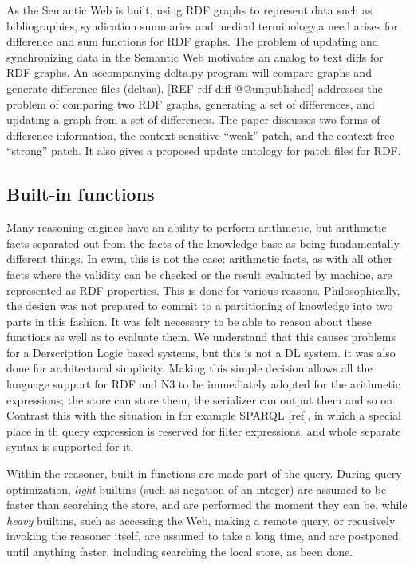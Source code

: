 \documentclass{tlp}
\begin{document}
\par As the Semantic Web is built, using RDF graphs\cite{RDFC04} to represent data such as
bibliographies\cite{DC02}, syndication
summaries\cite{RSS} and medical terminology\cite{Gol03},a need arises for difference and sum functions
for RDF graphs. The problem of updating and synchronizing data in
the Semantic Web motivates an analog to text diffs for RDF graphs.
An accompanying delta.py program will compare graphs and generate
difference files (deltas). [REF rdf diff @@unpublished] addresses
the problem of comparing two RDF graphs, generating a set of
differences, and updating a graph from a set of differences. The
paper discusses two forms of difference information, the
context-sensitive ``weak'' patch, and the context-free
``strong'' patch. It also gives a proposed update ontology for patch files for
RDF.
\subsection{\empty Built-in functions}
  

\par Many reasoning engines have an ability to perform arithmetic,
but arithmetic facts separated out from the facts of the knowledge
base as being fundamentally different things. In cwm, this is not
the case: arithmetic facts, as with all other facts where the
validity can be checked or the result evaluated by machine, are
represented as RDF properties. This is done for various reasons.
Philosophically, the design was not prepared to commit to a
partitioning of knowledge into two parts in this fashion. It was
felt necessary to be able to reason about these functions as well
as to evaluate them. We understand that this causes problems for a
Derscription Logic based systems, but this is not a DL system. it
was also done for architectural simplicity. Making this simple
decision allows all the language support for RDF and N3 to be
immediately adopted for the arithmetic expressions; the store can
store them, the serializer can output them and so on. Contrast this
with the situation in for example SPARQL [ref], in which a special
place in th query expression is reserved for filter expressions,
and whole separate syntax is supported for it.

\par Within the reasoner, built-in functions are made part of the
query. During query optimization, {\em light} builtins (such as
negation of an integer) are assumed to be faster than searching the
store, and are performed the moment they can be, while
{\em heavy} builtins, such as accessing the Web, making a remote
query, or recusively invoking the reasoner itself, are assumed to
take a long time, and are postponed until anything faster,
including searching the local store, as been done.
\end{document}

